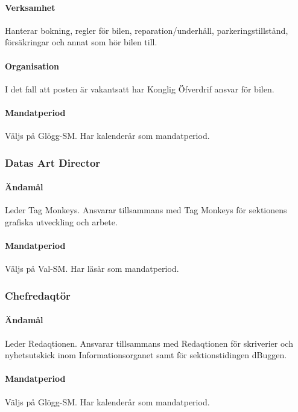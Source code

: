 \documentclass{dgovdoc}
\begin{document}
\paragraph{Verksamhet}

Hanterar bokning, regler för bilen, reparation/underhåll, parkeringstillstånd,
försäkringar och annat som hör bilen till.

\paragraph{Organisation}

I det fall att posten är vakantsatt har Konglig Öfverdrif ansvar för bilen.

\paragraph{Mandatperiod}

Väljs på Glögg-SM. Har kalenderår som mandatperiod.

\subsubsection{Datas Art Director}

\paragraph{Ändamål}
Leder Tag Monkeys. Ansvarar tillsammans med Tag Monkeys för sektionens
grafiska utveckling och arbete.

\paragraph{Mandatperiod}

Väljs på Val-SM. Har läsår som mandatperiod.

\subsubsection{Chefredaqtör}

\paragraph{Ändamål}
Leder Redaqtionen. Ansvarar tillsammans med Redaqtionen för skriverier och
nyhetsutskick inom Informationsorganet samt för sektionstidingen dBuggen.

\paragraph{Mandatperiod}
Väljs på Glögg-SM. Har kalenderår som mandatperiod.
\end{document}
